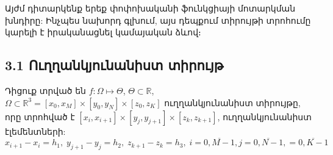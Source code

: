 \documentclass[fleqn, bachelor,subf,12pt,notitlepage]{article}
\begin{document}
Այժմ դիտարկենք երեք փոփոխականի ֆունկցիայի մոտարկման խնդիրը: Ինչպես նախորդ գլխում, այս դեպքում տիրույթի տրոհումը կարելի է իրականացնել կամայական ձևով։

\subsection*{{3.1 Ուղղանկյունանիստ տիրույթ}}

Դիցուք տրված են $f:\Omega\mapsto \Theta$,  $\Theta \subset \mathbb{R}$, $\Omega \subset \mathbb{R}^{3} = \left[x_{0}, x_{M}\right] \times \left[y_{0}, y_{N}\right] \times \left[z_{0}, z_{K}\right]$  ուղղանկյունանիստ տիրույթը, որը տրոհված է $\left[x_{i}, x_{i+1}\right] \times \left[y_{j}, y_{j+1}\right] \times \left[z_{k}, z_{k+1}\right]$, ուղղանկյունանիստ էլեմենտների:
$$x_{i+1}-x_{i}=h_{1}, \; y_{j+1}-y_{j}=h_{2}, \;z_{k+1}-z_{k}=h_{3}, \; i=\overline{0, M-1}, j=\overline{0, N-1},  =\overline{0, K-1}$$
\end{document}
